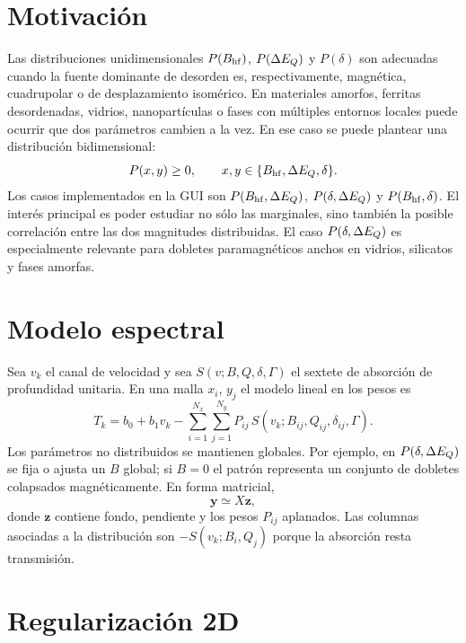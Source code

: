 \section{Motivación}

Las distribuciones unidimensionales $P(B_{\mathrm{hf}})$, $P(\Delta E_Q)$ y $P(\delta)$ son
adecuadas cuando la fuente dominante de desorden es, respectivamente, magnética,
cuadrupolar o de desplazamiento isomérico. En materiales amorfos, ferritas
desordenadas, vidrios, nanopartículas o fases con múltiples entornos locales
puede ocurrir que dos parámetros cambien a la vez. En ese caso se puede plantear
una distribución bidimensional:
\begin{equation}
  P(x,y)\ge 0,\qquad x,y\in\{B_{\mathrm{hf}},\Delta E_Q,\delta\}.
\end{equation}
Los casos implementados en la GUI son $P(B_{\mathrm{hf}},\Delta E_Q)$, $P(\delta,\Delta E_Q)$ y
$P(B_{\mathrm{hf}},\delta)$. El interés principal es poder estudiar no sólo las marginales,
sino también la posible correlación entre las dos magnitudes distribuidas. El
caso $P(\delta,\Delta E_Q)$ es especialmente relevante para dobletes paramagnéticos
anchos en vidrios, silicatos y fases amorfas.

\section{Modelo espectral}

Sea $v_k$ el canal de velocidad y sea $S(v;B,Q,\delta,\Gamma)$ el sextete de
absorción de profundidad unitaria. En una malla $x_i$, $y_j$ el modelo lineal en
los pesos es
\begin{equation}
  T_k = b_0 + b_1 v_k - \sum_{i=1}^{N_x}\sum_{j=1}^{N_y}
  P_{ij}\,S(v_k;B_{ij},Q_{ij},\delta_{ij},\Gamma).
\end{equation}
Los parámetros no distribuidos se mantienen globales. Por ejemplo, en
$P(\delta,\Delta E_Q)$ se fija o ajusta un $B$ global; si $B=0$ el patrón representa un
conjunto de dobletes colapsados magnéticamente.
En forma matricial,
\begin{equation}
  \bm y \simeq X\bm z,
\end{equation}
donde $\bm z$ contiene fondo, pendiente y los pesos $P_{ij}$ aplanados. Las
columnas asociadas a la distribución son $-S(v_k;B_i,Q_j)$ porque la absorción
resta transmisión.

\section{Regularización 2D}

